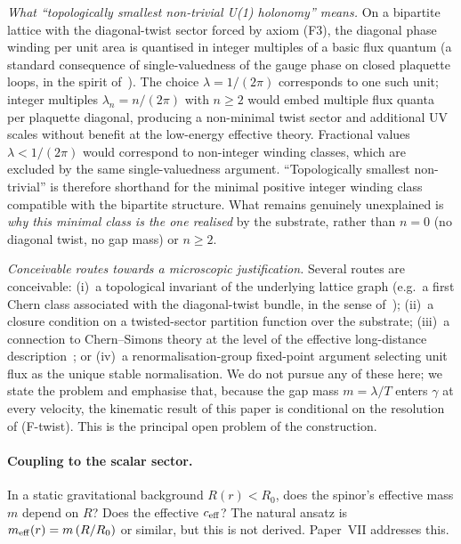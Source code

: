 \documentclass[11pt,a4paper]{article}
\begin{document}
\smallskip
\noindent\emph{What ``topologically smallest non-trivial U(1)
holonomy'' means.}
On a bipartite lattice with the diagonal-twist sector forced
by axiom (F3), the diagonal phase winding per unit area is
quantised in integer multiples of a basic flux quantum (a
standard consequence of single-valuedness of the gauge phase
on closed plaquette loops, in the spirit
of~\cite{thouless1982}). The choice $\lambda = 1/(2\pi)$
corresponds to one such unit; integer multiples
$\lambda_n = n/(2\pi)$ with $n \ge 2$ would embed multiple
flux quanta per plaquette diagonal, producing a non-minimal
twist sector and additional UV scales without benefit at the
low-energy effective theory. Fractional values
$\lambda < 1/(2\pi)$ would correspond to non-integer winding
classes, which are excluded by the same single-valuedness
argument. ``Topologically smallest non-trivial'' is therefore
shorthand for the minimal positive integer winding class
compatible with the bipartite structure. What remains
genuinely unexplained is \emph{why this minimal class is the
one realised} by the substrate, rather than $n = 0$ (no
diagonal twist, no gap mass) or $n \ge 2$.

\smallskip
\noindent\emph{Conceivable routes towards a microscopic
justification.} Several routes are conceivable:
(i)~a topological invariant of the underlying lattice graph
(e.g.\ a first Chern class associated with the diagonal-twist
bundle, in the sense of~\cite{thouless1982});
(ii)~a closure condition on a twisted-sector partition
function over the substrate; (iii)~a connection to
Chern--Simons theory at the level of the effective long-distance
description~\cite{witten1989}; or (iv)~a renormalisation-group
fixed-point argument selecting unit flux as the unique stable
normalisation. We do not pursue any of these here; we state the
problem and emphasise that, because the gap mass
$m = \lambda/T$ enters $\gamma$ at every velocity, the kinematic
result of this paper is conditional on the resolution of
(F-twist). This is the principal open problem of the
construction.

\paragraph{Coupling to the scalar sector.}
In a static gravitational background $R(r) < R_0$, does the
spinor's effective mass $m$ depend on $R$? Does the effective
$c_{\rm eff}$? The natural ansatz is $m_{\rm eff}(r) = m\, (R/R_0)$
or similar, but this is not derived. Paper~VII addresses this.
\end{document}
